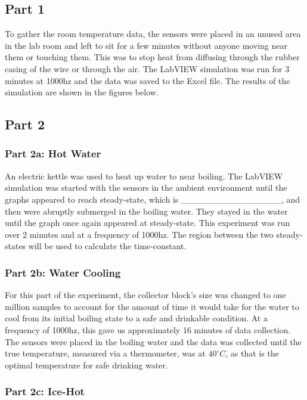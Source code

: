 \documentclass{article}
\begin{document}
\subsection{Part 1} %

To gather the room temperature data, the sensors were placed in an unused area in the lab room and left to sit for a few minutes without anyone moving near them or touching them.  This was to stop heat from diffusing through the rubber casing of the wire or through the air. The LabVIEW simulation was run for 3 minutes at 1000hz and the data was saved to the Excel file. The results of the simulation are shown in the figures below.

\subsection{Part 2} %
 
\subsubsection{Part 2a: Hot Water} %

An electric kettle was used to heat up water to near boiling.  The LabVIEW simulation was started with the sensors in the ambient environment until the graphs appeared to reach steady-state, which is ________________, and then were abruptly submerged in the boiling water.  They stayed in the water until the graph once again appeared at steady-state.  This experiment was run over 2 minutes and at a frequency of 1000hz.  The region between the two steady-states will be used to calculate the time-constant.  

\subsubsection{Part 2b: Water Cooling} %

For this part of the experiment, the collector block's size was changed to one million samples to account for the amount of time it would take for the water to cool from its initial boiling state to a safe and drinkable condition.  At a frequency of 1000hz, this gave us approximately 16 minutes of data collection.  The sensors were placed in the boiling water and the data was collected until the true temperature, measured via a thermometer, was at \(40^\circ C\), as that is the optimal temperature for safe drinking water.  

\subsubsection{Part 2c: Ice-Hot} %
\end{document}
